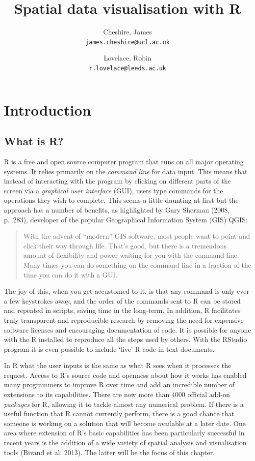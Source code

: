 \documentclass[]{article}
\author{
Cheshire, James\\
\texttt{james.cheshire@ucl.ac.uk}
\and
Lovelace, Robin\\
\texttt{r.lovelace@leeds.ac.uk}
}
\title{Spatial data visualisation with R}
\author{}
\date{}
\begin{document}
\section{Introduction}\label{introduction}

\subsection{What is R?}\label{what-is-r}

R is a free and open source computer program that runs on all major
operating systems. It relies primarily on the \emph{command line} for
data input. This means that instead of interacting with the program by
clicking on different parts of the screen via a \emph{graphical user
interface} (GUI), users type commands for the operations they wish to
complete. This seems a little daunting at first but the approach has a
number of benefits, as highlighted by Gary Sherman (2008, p.~283),
developer of the popular Geographical Information System (GIS) QGIS:

\begin{quote}
With the advent of ``modern'' GIS software, most people want to point
and click their way through life. That's good, but there is a tremendous
amount of flexibility and power waiting for you with the command line.
Many times you can do something on the command line in a fraction of the
time you can do it with a GUI.
\end{quote}

The joy of this, when you get accustomed to it, is that any command is
only ever a few keystrokes away, and the order of the commands sent to R
can be stored and repeated in scripts, saving time in the long-term. In
addition, R facilitates truly transparent and reproducible research by
removing the need for expensive software licenses and encouraging
documentation of code. It is possible for anyone with the R installed to
reproduce all the steps used by others. With the RStudio program it is
even possible to include `live' R code in text documents.

In R what the user inputs is the same as what R sees when it processes
the request. Access to R's source code and openness about how it works
has enabled many programmers to improve R over time and add an
incredible number of extensions to its capabilities. There are now more
than 4000 official add-on \emph{packages} for R, allowing it to tackle
almost any numerical problem. If there is a useful function that R
cannot currently perform, there is a good chance that someone is working
on a solution that will become available at a later date. One area where
extension of R's basic capabilities has been particularly successful in
recent years is the addition of a wide variety of spatial analysis and
visualisation tools (Bivand et al. 2013). The latter will be the focus
of this chapter.
\end{document}
